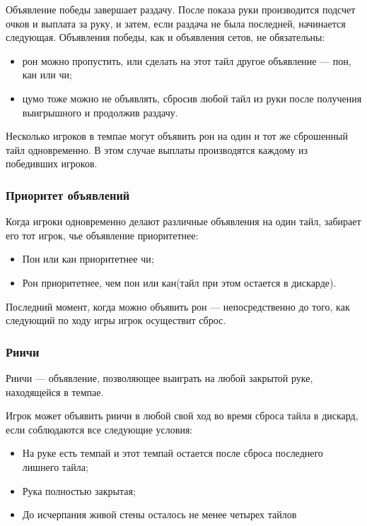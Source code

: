 Объявление победы завершает раздачу. После показа руки производится подсчет очков и выплата за руку, и затем, если раздача не была последней, начинается следующая. Объявления победы, как и объявления сетов, не обязательны:
\begin{itemize}
	\item рон можно пропустить, или сделать на этот тайл другое объявление --- пон, кан или чи;
	\item цумо тоже можно не объявлять, сбросив любой тайл из руки после получения выигрышного и продолжив раздачу.
\end{itemize}

Несколько игроков в темпае могут объявить рон на один и тот же сброшенный тайл одновременно. В этом случае выплаты производятся каждому из победивших игроков. 


\subsubsection{Приоритет объявлений}

Когда игроки одновременно делают различные объявления на один тайл, забирает его тот игрок, чье объявление приоритетнее:

\begin{itemize}
	\item Пон или кан приоритетнее чи;
	\item Рон приоритетнее, чем пон или кан(тайл при этом остается в дискарде).
\end{itemize}

Последний момент, когда можно объявить рон --- непосредственно до того, как следующий по ходу игры игрок осуществит сброс.


\subsubsection{Риичи}

Риичи --- объявление, позволяющее выиграть на любой закрытой руке, находящейся в темпае. 

Игрок может объявить риичи в любой свой ход во время сброса тайла в дискард, если соблюдаются все следующие условия:

\begin{itemize}
	\item На руке есть темпай и этот темпай остается после сброса последнего лишнего тайла;
	\item Рука полностью закрытая;
	\item До исчерпания живой стены осталось не менее четырех тайлов 
\end{itemize}


